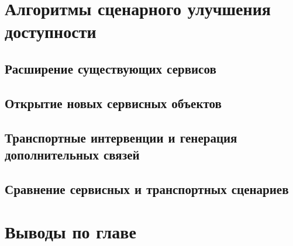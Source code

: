 \section{Алгоритмы сценарного улучшения доступности}
\label{sec:accessibility-improvement-algorithms}

\subsection{Расширение существующих сервисов}
\label{subsec:service-expansion}

\subsection{Открытие новых сервисных объектов}
\label{subsec:new-service-opening}

\subsection{Транспортные интервенции и генерация дополнительных связей}
\label{subsec:transport-interventions}

\subsection{Сравнение сервисных и транспортных сценариев}
\label{subsec:scenario-comparison}

\section{Выводы по главе}
\label{sec:chapter2-conclusions}
